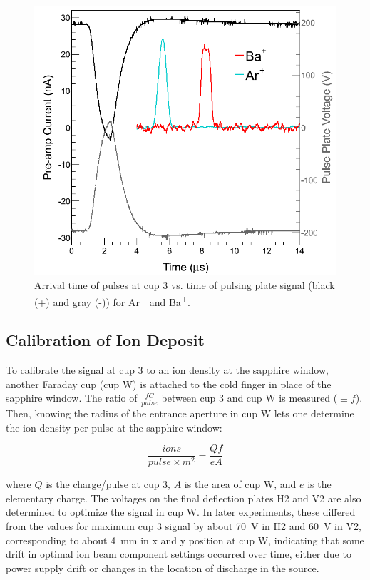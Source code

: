 \begin{figure}[h]
        \centering
                \includegraphics[width=.7\textwidth]{figures/pulses_BaAr.png}
                \caption{Arrival time of pulses at cup 3 vs. time of pulsing plate signal (black (+) and gray (-)) for Ar\textsuperscript{+} and Ba\textsuperscript{+}.}
\label{fig:pulses_ArBa}
\end{figure}

\subsection{Calibration of Ion Deposit}
\label{subsec:ionDepCal}

To calibrate the signal at cup 3 to an ion density at the sapphire window, another Faraday cup (cup W) is attached to the cold finger in place of the sapphire window.  The ratio of $\frac{fC}{pulse}$ between cup 3 and cup W is measured ($\equiv f$).  Then, knowing the radius of the entrance aperture in cup W lets one determine the ion density per pulse at the sapphire window:

\begin{equation}
\frac{ions}{pulse \times m^{2}} = \frac{Q f}{e A}
\label{eqn:ion_density}
\end{equation}

\noindent
where $Q$ is the charge/pulse at cup 3, $A$ is the area of cup W, and $e$ is the elementary charge.  The voltages on the final deflection plates H2 and V2 are also determined to optimize the signal in cup W.  In later experiments, these differed from the values for maximum cup 3 signal by about 70~V in H2 and 60~V in V2, corresponding to about 4~mm in x and y position at cup W, indicating that some drift in optimal ion beam component settings occurred over time, either due to power supply drift or changes in the location of discharge in the source.

